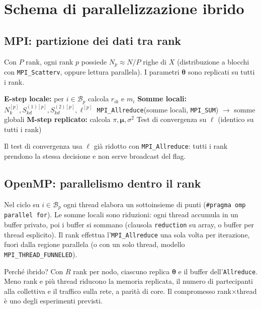 \documentclass[11pt,a4paper]{article}
\newcommand{\bmu}{\boldsymbol{\mu}}
\newcommand{\bth}{\boldsymbol{\theta}}
\theoremstyle{definition}
\begin{document}
\section{Schema di parallelizzazione ibrido}

\subsection{MPI: partizione dei dati tra rank}
Con $P$ rank, ogni rank $p$ possiede $N_p\approx N/P$ righe di $X$ (distribuzione
a blocchi con \texttt{MPI\_Scatterv}, oppure lettura parallela). I parametri $\bth$ sono
replicati su tutti i rank.

\begin{algorithm}[h]
\caption{Iterazione EM distribuita (rank $p$)}
\begin{algorithmic}[1]
\State \textbf{E-step locale:} per $i\in\mathcal{B}_p$ calcola $r_{ik}$ e $m_i$ 
\State \textbf{Somme locali:} $N_k^{[p]},S^{(1)[p]}_{kd},S^{(2)[p]}_{kd},\ell^{[p]}$ 
\State \texttt{MPI\_Allreduce}(somme locali, \texttt{MPI\_SUM}) $\to$ somme globali 
\State \textbf{M-step replicato:} calcola $\pi,\bmu,\sigma^2$ 
\State Test di convergenza su $\ell$ (identico su tutti i rank)
\end{algorithmic}
\end{algorithm}

Il test di convergenza usa $\ell$ già ridotto con \texttt{MPI\_Allreduce}: tutti i rank
prendono la stessa decisione e non serve broadcast del flag.

\subsection{OpenMP: parallelismo dentro il rank}
Nel ciclo su $i\in\mathcal{B}_p$ ogni thread elabora un sottoinsieme di punti
(\texttt{\#pragma omp parallel for}). Le somme locali sono riduzioni: ogni thread
accumula in un buffer privato, poi i buffer si sommano (clausola
\texttt{reduction} su array, o buffer per thread esplicito). Il rank effettua
l'\texttt{MPI\_Allreduce} una sola volta per iterazione, fuori dalla regione
parallela (o con un solo thread, modello \texttt{MPI\_THREAD\_FUNNELED}).

Perché ibrido? Con $R$ rank per nodo, ciascuno replica $\bth$ e il buffer
dell'\texttt{Allreduce}. Meno rank e più thread riducono la memoria replicata, il
numero di partecipanti alla collettiva e il traffico sulla rete, a parità di core.
Il compromesso rank$\times$thread è uno degli esperimenti previsti.
\end{document}

